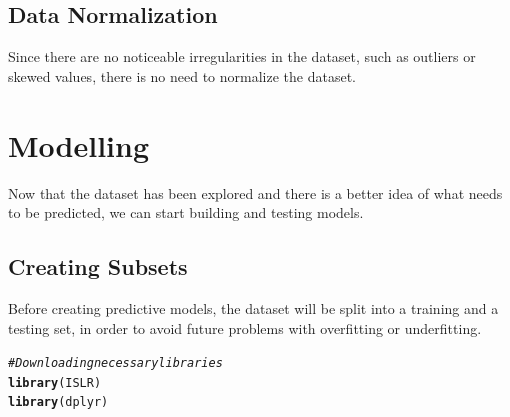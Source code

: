 \documentclass[a4paper,12pt]{article}\usepackage[]{graphicx}\usepackage[]{color}
\makeatletter
\newcommand{\hlcom}[1]{\textcolor[rgb]{0.678,0.584,0.686}{\textit{#1}}}%
\newcommand{\hlstd}[1]{\textcolor[rgb]{0.345,0.345,0.345}{#1}}%
\newcommand{\hlkwd}[1]{\textcolor[rgb]{0.737,0.353,0.396}{\textbf{#1}}}%
\newenvironment{kframe}{%
 \def\at@end@of@kframe{}%
 \ifinner\ifhmode%
  \def\at@end@of@kframe{\end{minipage}}%
  \begin{minipage}{\columnwidth}%
 \fi\fi%
 \def\FrameCommand##1{\hskip\@totalleftmargin \hskip-\fboxsep
 \colorbox{shadecolor}{##1}\hskip-\fboxsep
     \hskip-\linewidth \hskip-\@totalleftmargin \hskip\columnwidth}%
 \MakeFramed {\advance\hsize-\width
   \@totalleftmargin\z@ \linewidth\hsize
   \@setminipage}}%
 {\par\unskip\endMakeFramed%
 \at@end@of@kframe}
\newenvironment{knitrout}{}{} %
\makeatother
\begin{document}
\subsection{Data Normalization}\label{data_normalization}
Since there are no noticeable irregularities in the dataset, such as outliers or skewed values, there is no need to normalize the dataset.

\section{Modelling}\label{modelling}
Now that the dataset has been explored and there is a better idea of what needs to be predicted, we can start building and testing models.

\subsection{Creating Subsets}\label{subsets}
Before creating predictive models, the dataset will be split into a training and a testing set, in order to avoid future problems with overfitting or underfitting.

\begin{knitrout}
\color{fgcolor}\begin{kframe}
\begin{alltt}
\hlcom{# Downloading necessary libraries}
\hlkwd{library}\hlstd{(ISLR)}
\hlkwd{library}\hlstd{(dplyr)}
\end{alltt}
\end{kframe}
\end{knitrout}
\end{document}

